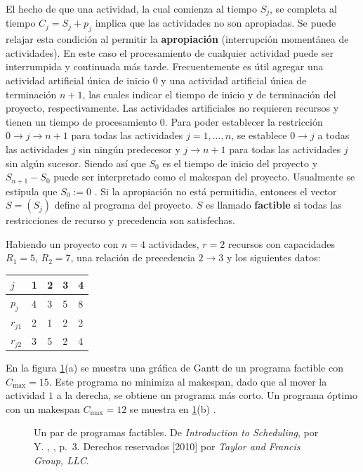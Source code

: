 \documentclass[spanish,draft,12pt,headsepline,footsepline,paper=letter]{scrreprt}
\begin{document}
  El hecho de que una actividad, la cual comienza al tiempo $S_j$, se completa al tiempo $C_j=S_j+p_j$ implica que las actividades no son apropiadas. Se puede relajar esta condición al permitir la \textbf{apropiación} (interrupción momentánea de actividades). En este caso el procesamiento de cualquier actividad puede ser interrumpida y continuada más tarde.
Frecuentemente es útil agregar una actividad artificial única de inicio $0$ y una actividad artificial única de terminación $n+1$, las cuales indicar el tiempo de inicio y de terminación del proyecto, respectivamente. Las actividades artificiales no requieren recursos y tienen un tiempo de procesamiento $0$. Para poder establecer la restricción $0 \to j \to n+1$ para todas las actividades $j=1,\dots,n$, se establece $0 \to j$ a todas las actividades $j$ sin ningún predecesor y $j \to n+1$ para todas las actividades $j$ sin algún sucesor. Siendo así que $S_0$ es el tiempo de inicio del proyecto y $S_{n+1}-S_0$ puede ser interpretado como el makespan del proyecto. Usualmente se estipula que $S_0:=0$ \citep[p.~2,~3]{Robert2010}.
Si la apropiación no está permitidia, entonces el vector $S=(S_j)$ define al programa del proyecto. $S$ es llamado \textbf{factible} si todas las restricciones de recurso y precedencia son satisfechas.

Habiendo un proyecto con $n=4$ actividades, $r=2$ recursos con capacidades $R_1=5$, $R_2=7$, una relación de precedencia $2 \to 3$ y los siguientes datos:

\begin{table}[h]
\centering
\begin{tabular}{l|llll}
\toprule
  $j$ & 1 & 2 & 3 & 4 \\
  \midrule
  $p_j$ & 4 & 3 & 5 & 8 \\
  $r_{j1}$ & 2 & 1 & 2 & 2 \\
  $r_{j2}$ & 3 & 5 & 2 & 4 \\
  \bottomrule
\end{tabular}
\label{tab:project_data}
\end{table}

En la figura \ref{fig:feasible_schedules}(a) se muestra una gráfica de Gantt de un programa factible con $C_{\max}=15$. Este programa no minimiza al makespan, dado que al mover la actividad $1$ a la derecha, se obtiene un programa más corto. Un programa óptimo con un makespan $C_{\max}=12$ se muestra en \ref{fig:feasible_schedules}(b) \citep[p.~3]{Robert2010}.

\begin{figure}[hbtp]
\centering

\caption[Programas factibles]{Un par de programas factibles. De \textit{Introduction to Scheduling}, por Y. \citeauthor{Robert2010}, \citeyear{Robert2010}, p.~3. Derechos reservados [2010] por \textit{Taylor and Francis Group, LLC}.}
\label{fig:feasible_schedules}
\end{figure}
\end{document}
